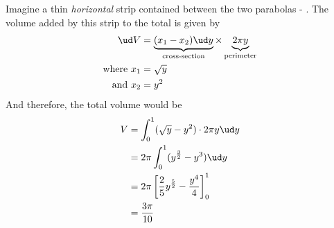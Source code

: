 \begin{solution}
	Imagine a thin \textit{horizontal} strip contained between the two 
	parabolas - \asif. The  volume added by this strip to the total 
	is given by
	\begin{align}
		\ud V &= \underbrace{(x_1-x_2)\ud y}_{\text{cross-section}}\times
		         \underbrace{2\pi y}_{\text{perimeter}} \\
		\text{where } x_1 &= \sqrt{y} \\
		\text{and } x_2 &= y^2
	\end{align}
	And therefore, the total volume would be
	\begin{align}
		V &= \int_0^1 (\sqrt{y} - y^2)\cdot 2\pi y\ud y \\
		  &= 2\pi\int_0^1 (y^{\frac{3}{2}} - y^3)\ud y \\
		  &= 2\pi\left[ \dfrac{2}{5}y^{\frac{5}{2}} - \dfrac{y^4}{4}\right]_0^1 \\
		  &= \dfrac{3\pi}{10}
	\end{align}
\end{solution}
